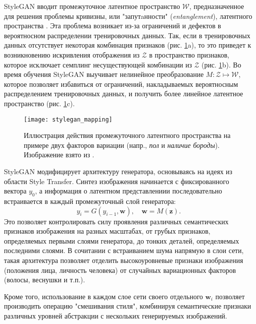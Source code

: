 StyleGAN вводит промежуточное латентное пространство $\mathcal W$, предназначенное для решения проблемы кривизны, или "запутaнности" \foreignlanguage{english}{(\emph{entanglement})}, латентного пространства \cite{arvanitidis2018oddity}. 
Эта проблема возникает из-за ограничений и дефектов в вероятносном распределении тренировочных данных.
Так, если в тренировочных данных отсутствует некоторая комбинация признаков (рис. \ref{fig:stylegan-mapping}a), то это приведет к возникновению искривления отображения из $\mathcal Z$ в пространство признаков, которое исключает семплинг несуществующей комбинации из $\mathcal Z$ (рис. \ref{fig:stylegan-mapping}b). 
Во время обучения StyleGAN выучивает нелинейное преобразование $M: \mathcal Z \mapsto \mathcal W$, которое позволяет избавиться от ограничений, накладываемых вероятносным распределением тренировочных данных, и получить более линейное латентное пространство  (рис. \ref{fig:stylegan-mapping}c).

\begin{figure}[h]
\begin{center}
    \texttt{[image: stylegan\_mapping]}
    \caption{Иллюстрация действия промежуточного латентного пространства на примере двух факторов вариации (напр., \emph{пол} и \emph{наличие бороды}). Изображение взято из \cite{StyleGAN}.}
    \label{fig:stylegan-mapping}
\end{center}
\end{figure}

StyleGAN модифицирует архитектуру генератора, основываясь на идеях из области Style Transfer. 
Синтез изображения начинается с фиксированного вектора $y_0$, а информация о латентном представлениии последовательно встраивается в каждый промежуточный слой генератора:
$$ y_i = G(y_{i-1}, \mathbf w),\quad \mathbf w = M(\mathbf z). $$
Это позволяет контролировать силу проявления различных семантических признаков изображения на разных масштабах, от грубых признаков, определяемых первыми слоями генератора, до тонких деталей, определяемых последними слоями.
В сочитании с встраиванием шума напрямую в слои сети, такая архитектура позволяет отделить высокоуровневые признаки изображения (положения лица, личность человека) от случайных вариационных факторов (волосы, веснушки и т.п.).

Кроме того, использование в каждом слое сети своего отдельного $\mathbf w_i$ позволяет производить операцию "смешивания стиля", комбинируя семантические признаки различных уровней абстракции с нескольких генерируемых изображений.

